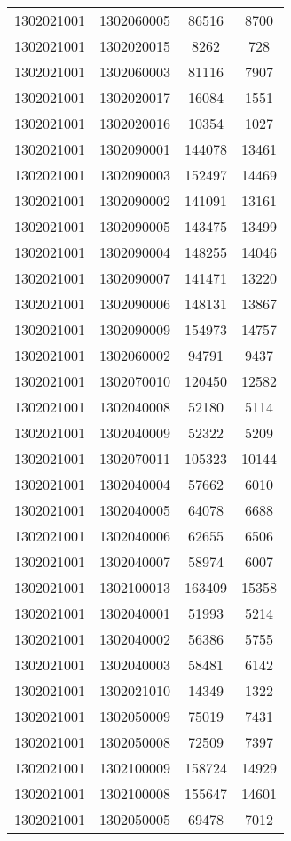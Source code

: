 \begin{longtable}{llcc}
1302021001 & 1302060005 & 86516 & 8700\\
1302021001 & 1302020015 & 8262 & 728\\
1302021001 & 1302060003 & 81116 & 7907\\
1302021001 & 1302020017 & 16084 & 1551\\
1302021001 & 1302020016 & 10354 & 1027\\
1302021001 & 1302090001 & 144078 & 13461\\
1302021001 & 1302090003 & 152497 & 14469\\
1302021001 & 1302090002 & 141091 & 13161\\
1302021001 & 1302090005 & 143475 & 13499\\
1302021001 & 1302090004 & 148255 & 14046\\
1302021001 & 1302090007 & 141471 & 13220\\
1302021001 & 1302090006 & 148131 & 13867\\
1302021001 & 1302090009 & 154973 & 14757\\
1302021001 & 1302060002 & 94791 & 9437\\
1302021001 & 1302070010 & 120450 & 12582\\
1302021001 & 1302040008 & 52180 & 5114\\
1302021001 & 1302040009 & 52322 & 5209\\
1302021001 & 1302070011 & 105323 & 10144\\
1302021001 & 1302040004 & 57662 & 6010\\
1302021001 & 1302040005 & 64078 & 6688\\
1302021001 & 1302040006 & 62655 & 6506\\
1302021001 & 1302040007 & 58974 & 6007\\
1302021001 & 1302100013 & 163409 & 15358\\
1302021001 & 1302040001 & 51993 & 5214\\
1302021001 & 1302040002 & 56386 & 5755\\
1302021001 & 1302040003 & 58481 & 6142\\
1302021001 & 1302021010 & 14349 & 1322\\
1302021001 & 1302050009 & 75019 & 7431\\
1302021001 & 1302050008 & 72509 & 7397\\
1302021001 & 1302100009 & 158724 & 14929\\
1302021001 & 1302100008 & 155647 & 14601\\
1302021001 & 1302050005 & 69478 & 7012\\

\end{longtable}
